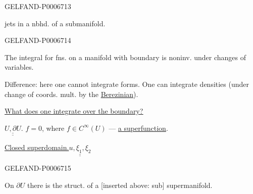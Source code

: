 \begin{GelfandAdjacentEvidence}{GELFAND-P000671}{3}


jets in a nbhd. of a submanifold.
\end{GelfandAdjacentEvidence}
\begin{GelfandAdjacentEvidence}{GELFAND-P000671}{4}


The integral for fns. on a manifold with boundary is noninv. under changes of variables.

Difference: here one cannot integrate forms. One can integrate densities (under change of coords. mult. by the \underline{Berezinian}).

\underline{\underline{What does one integrate over the boundary?}}

\(\underline{\underline{U,\partial U}}.\)\quad
\(f=0\), where \(f\in C^\infty(U)\) --- \underline{a superfunction}.

\underline{Closed superdomain.}\quad \(\underline{\underline{u,\xi_1,\xi_2}}\)
\end{GelfandAdjacentEvidence}
\begin{GelfandAdjacentEvidence}{GELFAND-P000671}{5}


On \(\partial U\) there is the struct. of a [inserted above: sub] supermanifold.
\end{GelfandAdjacentEvidence}
